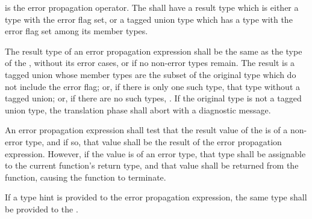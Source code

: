 \specsubsubitem
{} is the error propagation operator. The
 shall have a result type which is either a
type with the error flag set, or a tagged union type which has a type with the
error flag set among its member types.

\specsubsubitem
The result type of an error propagation expression shall be the same as the
type of the , without its error cases, or
 if no non-error types remain. The result is a tagged union
whose member types are the subset of the original type which do not include the
error flag; or, if there is only one such type, that type without a tagged
union; or, if there are no such types, . If the original type is
not a tagged union type, the translation phase shall abort with a diagnostic
message.

\specsubsubitem
An error propagation expression shall test that the result value of the
 is of a non-error type, and if so, that value
shall be the result of the error propagation expression. However, if the value
is of an error type, that type shall be assignable to the current function's
return type, and that value shall be returned from the function, causing the
function to terminate.

\specsubsubitem
If a type hint is provided to the error propagation expression, the same type
shall be provided to the .


\begin{grammar}
 \\
	 \\
	 \\
	 \\
	 \\
	 \\
	 \\

 \\
	 \\
	 \\
	 \\
\end{grammar}

